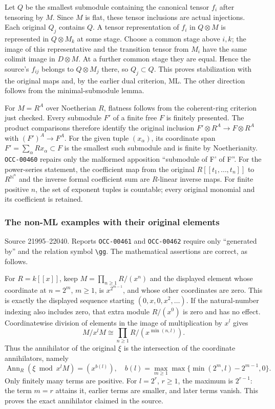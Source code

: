 Let \(Q\) be the smallest submodule containing the canonical tensor \(f_i\) after tensoring by \(M\). Since \(M\) is flat, these tensor inclusions are actual injections. Each original \(Q_j\) contains \(Q\). A tensor representation of \(f_i\) in \(Q\otimes M\) is represented in \(Q\otimes M_k\) at some stage. Choose a common stage above \(i,k\); the image of this representative and the transition tensor from \(M_i\) have the same colimit image in \(D\otimes M\). At a further common stage they are equal. Hence the source's \(f_{ij}\) belongs to \(Q\otimes M_j\) there, so \(Q_j\subset Q\). This proves stabilization with the original maps and, by the earlier dual criterion, ML. The other direction follows from the minimal-submodule lemma.

For \(M=R^A\) over Noetherian \(R\), flatness follows from the coherent-ring criterion just checked. Every submodule \(F'\) of a finite free \(F\) is finitely presented. The product comparisons therefore identify the original inclusion \(F'\otimes R^A\to F\otimes R^A\) with \((F')^A\to F^A\). For the given tuple \((x_\alpha)\), its coordinate span \(F'=\sum_\alpha Rx_\alpha\subset F\) is the smallest such submodule and is finite by Noetherianity. \texttt{OCC-00460} repairs only the malformed apposition ``submodule of F' of F''. For the power-series statement, the coefficient map from the original \(R[[t_1,\ldots,t_n]]\) to \(R^{\mathbb N^n}\) and the inverse formal coefficient sum are \(R\)-linear inverse maps. For finite positive \(n\), the set of exponent tuples is countable; every original monomial and its coefficient is retained.

\subsubsection{The non-ML examples with their original elements}\label{the-non-ml-examples-with-their-original-elements}

Source 21995--22040. Reports \texttt{OCC-00461} and \texttt{OCC-00462} require only ``generated by'' and the relation symbol \texttt{\textbackslash{}gg}. The mathematical assertions are correct, as follows.

For \(R=k[[x]]\), keep \(M=\prod_{n\geq1}R/(x^n)\) and the displayed element whose coordinate at \(n=2^m\), \(m\geq1\), is \(x^{2^{m-1}}\), and whose other coordinates are zero. This is exactly the displayed sequence starting \((0,x,0,x^2,\ldots)\). If the natural-number indexing also includes zero, that extra module \(R/(x^0)\) is zero and has no effect. Coordinatewise division of elements in the image of multiplication by \(x^l\) gives \[
M/x^lM\cong\prod_{n\geq1}R/(x^{\min(n,l)}).
\] Thus the annihilator of the original \(\xi\) is the intersection of the coordinate annihilators, namely \[
\operatorname{Ann}_R(\xi\bmod x^lM)=(x^{b(l)}),
\quad b(l)=\max_{m\geq1}\max\{\min(2^m,l)-2^{m-1},0\}.
\] Only finitely many terms are positive. For \(l=2^r\), \(r\geq1\), the maximum is \(2^{r-1}\): the term \(m=r\) attains it, earlier terms are smaller, and later terms vanish. This proves the exact annihilator claimed in the source.

